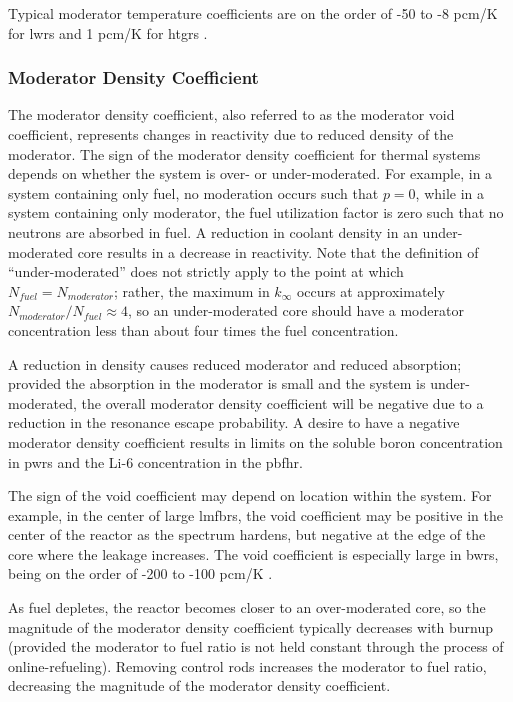 



Typical moderator temperature coefficients are on the order of -50 to -8 pcm/K for \glspl{lwr} and 1 pcm/K for \glspl{htgr} \cite{duderstadt}. 

\subsubsection{Moderator Density Coefficient}
The moderator density coefficient, also referred to as the moderator void coefficient, represents changes in reactivity due to reduced density of the moderator. The sign of the moderator density coefficient for thermal systems depends on whether the system is over- or under-moderated. For example, in a system containing only fuel, no moderation occurs such that \(p=0\), while in a system containing only moderator, the fuel utilization factor is zero such that no neutrons are absorbed in fuel. A reduction in coolant density in an under-moderated core results in a decrease in reactivity. Note that the definition of ``under-moderated'' does not strictly apply to the point at which \(N_{fuel}=N_{moderator}\); rather, the maximum in \(k_\infty\) occurs at approximately \(N_{moderator}/N_{fuel}\approx4\), so an under-moderated core should have a moderator concentration less than about four times the fuel concentration. 

A reduction in density causes reduced moderator and reduced absorption; provided the absorption in the moderator is small and the system is under-moderated, the overall moderator density coefficient will be negative due to a reduction in the resonance escape probability. A desire to have a negative moderator density coefficient results in limits on the soluble boron concentration in \glspl{pwr} and the Li-6 concentration in the \gls{pbfhr}. 

The sign of the void coefficient may depend on location within the system. For example, in the center of large \glspl{lmfbr}, the void coefficient may be positive in the center of the reactor as the spectrum hardens, but negative at the edge of the core where the leakage increases. The void coefficient is especially large in \glspl{bwr}, being on the order of -200 to -100 pcm/K \cite{duderstadt}. 

As fuel depletes, the reactor becomes closer to an over-moderated core, so the magnitude of the moderator density coefficient typically decreases with burnup (provided the moderator to fuel ratio is not held constant through the process of online-refueling). Removing control rods increases the moderator to fuel ratio, decreasing the magnitude of the moderator density coefficient.